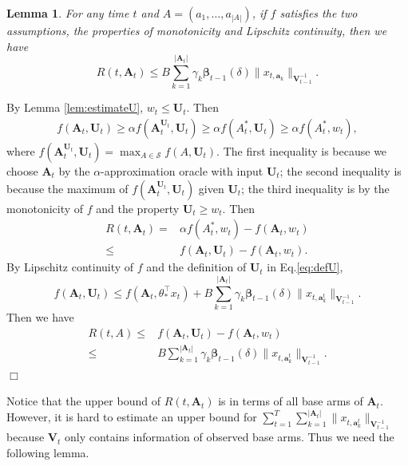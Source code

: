 \documentclass{article}
\newcommand{\bbeta}{\boldsymbol{\beta}}
\newcommand{\bA}{\mathbf{A}}
\newcommand{\ba}{\mathbf{a}}
\newcommand{\bU}{\mathbf{U}}
\newcommand{\bV}{\mathbf{V}}
\newcommand{\cS}{\mathcal{S}}
\newcommand{\abs}[1]{\left| #1 \right|}
\newcommand{\norm}[1]{\| #1 \|}
\newtheorem{lemma}[theorem]{Lemma}%
\newenvironment{proof}{\noindent {\textbf{Proof. }}}{$\Box$ \medskip}
\begin{document}
\begin{lemma} %
	\label{lem:DeltaEstimate}
	For any time $t$ and $A = (a_1, \ldots, a_{\abs{A}})$, if $f$ satisfies the two assumptions, the properties of monotonicity and Lipschitz continuity, 
	then we have
	$$
		R(t, \bA_t) \leq B \sum_{k=1}^{\abs{\bA_t}} \gamma_k \bbeta_{t-1}(\delta)\norm{x_{t, \ba_k}}_{\bV_{t-1}^{-1}}.
	$$
\end{lemma}
\begin{proof}
	By Lemma \ref{lem:estimateU}, $w_t \leq \bU_t$. Then
	\begin{align*}
		f(\bA_t, \bU_t) \geq \alpha f(\bA_t^{\bU_t}, \bU_t) \geq \alpha f(A_t^*, \bU_t) \geq \alpha f(A_t^*, w_t),
	\end{align*}
	where $f(\bA_t^{\bU_t}, \bU_t) = \max_{A \in \cS} f(A, \bU_t)$. The first inequality is because we choose $\bA_t$ by the $\alpha$-approximation oracle with input $\bU_t$; the second inequality is because the maximum of $f(\bA_t^{\bU_t}, \bU_t)$ given $\bU_t$; the third inequality is by the monotonicity of $f$ and the property $\bU_t \geq w_t$. Then
	\begin{align*}
		R(t, \bA_t) = &\alpha f(A_t^*, w_t) - f(\bA_t, w_t) \\
		\leq &f(\bA_t, \bU_t) - f(\bA_t, w_t).
	\end{align*}
	By Lipschitz continuity of $f$ and the definition of $\bU_t$ in Eq.\eqref{eq:defU},
	$$
	f(\bA_t, \bU_t) \leq f(\bA_t, \theta_{\ast}^{\top}x_t) + B \sum_{k=1}^{\abs{\bA_t}} \gamma_k \bbeta_{t-1}(\delta)\norm{x_{t, \ba_k^t}}_{\bV_{t-1}^{-1}}.
	$$
	Then we have
	\begin{align*}
		R(t, A) \leq &f(\bA_t, \bU_t) - f(\bA_t, w_t) \\
		\leq &B \sum_{k=1}^{\abs{\bA_t}} \gamma_k \bbeta_{t-1}(\delta)\norm{x_{t, \ba_k^t}}_{\bV_{t-1}^{-1}}.
	\end{align*}
\end{proof}

Notice that the upper bound of $R(t, \bA_t)$ is in terms of all base arms of $\bA_t$. However, it is hard to estimate an upper bound for $\sum_{t=1}^T \sum_{k=1}^{\abs{\bA_t}} \norm{ x_{t, \ba_k^t} }_{ \bV_{t-1}^{-1} }$ because $\bV_t$ only contains information of observed base arms. Thus we need the following lemma.
\end{document}
